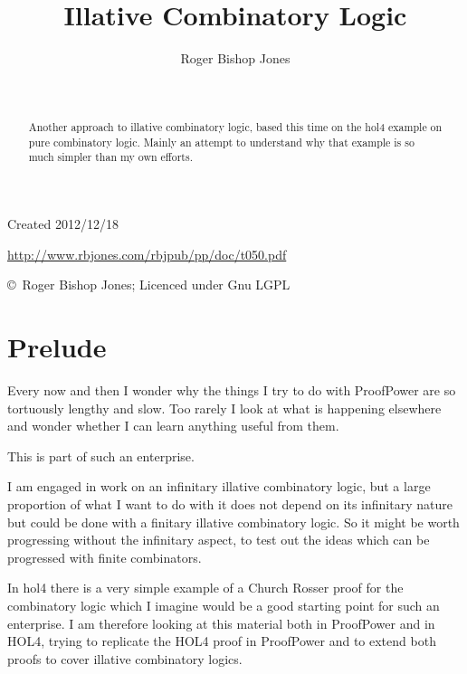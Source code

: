 \documentclass[11pt]{article}
\title{Illative Combinatory Logic}
\author{Roger Bishop Jones}
\date{\ }
\begin{document}
\begin{titlepage}
\maketitle
\begin{abstract}
Another approach to illative combinatory logic, based this time on the hol4 example on pure combinatory logic.
Mainly an attempt to understand why that example is so much simpler than my own efforts.
\end{abstract}
\vfill

\begin{centering}
{\footnotesize

Created 2012/12/18



\href{http://www.rbjones.com/rbjpub/pp/doc/t050.pdf}
{http://www.rbjones.com/rbjpub/pp/doc/t050.pdf}

\copyright\ Roger Bishop Jones; Licenced under Gnu LGPL

}%
\end{centering}

\thispagestyle{empty}
\end{titlepage}

\newpage
\addtocounter{page}{1}
{\parskip=0pt\tableofcontents}

\section{Prelude}

Every now and then I wonder why the things I try to do with ProofPower are so tortuously lengthy and slow.
Too rarely I look at what is happening elsewhere and wonder whether I can learn anything useful from them.

This is part of such an enterprise.

I am engaged in work on an infinitary illative combinatory logic, but a large proportion of what I want to do with it does not depend on its infinitary nature but could be done with a finitary illative combinatory logic.
So it might be worth progressing without the infinitary aspect, to test out the ideas which can be progressed with finite combinators.

In hol4 there is a very simple example of a Church Rosser proof for the combinatory logic which I imagine would be a good starting point for such an enterprise.
I am therefore looking at this material both in ProofPower and in HOL4, trying to replicate the HOL4 proof in ProofPower and to extend both proofs to cover illative combinatory logics.
\end{document}
